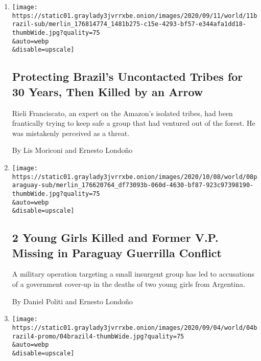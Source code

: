 \begin{enumerate}
\def\labelenumi{\arabic{enumi}.}
\item
  \href{/2020/09/11/world/americas/brazil-uncontacted-tribes.html}{}

  \texttt{[image: https://static01.graylady3jvrrxbe.onion/images/2020/09/11/world/11brazil-sub/merlin\_176814774\_1481b275-c15e-4293-bf57-e344afa1dd18-thumbWide.jpg?quality=75\\\&auto=webp\\\&disable=upscale]}

  \hypertarget{protecting-brazils-uncontacted-tribes-for-30-years-then-killed-by-an-arrow}{%
  \subsection{Protecting Brazil's Uncontacted Tribes for 30 Years, Then
  Killed by an
  Arrow}\label{protecting-brazils-uncontacted-tribes-for-30-years-then-killed-by-an-arrow}}

  Rieli Franciscato, an expert on the Amazon's isolated tribes, had been
  frantically trying to keep safe a group that had ventured out of the
  forest. He was mistakenly perceived as a threat.

  By Lis Moriconi and Ernesto Londoño
\item
  \href{/2020/09/11/world/americas/paraguay-military-girls.html}{}

  \texttt{[image: https://static01.graylady3jvrrxbe.onion/images/2020/10/08/world/08paraguay-sub/merlin\_176620764\_df73093b-060d-4630-bf87-923c97398190-thumbWide.jpg?quality=75\\\&auto=webp\\\&disable=upscale]}

  \hypertarget{2-young-girls-killed-and-former-vp-missing-in-paraguay-guerrilla-conflict}{%
  \subsection{2 Young Girls Killed and Former V.P. Missing in Paraguay
  Guerrilla
  Conflict}\label{2-young-girls-killed-and-former-vp-missing-in-paraguay-guerrilla-conflict}}

  A military operation targeting a small insurgent group has led to
  accusations of a government cover-up in the deaths of two young girls
  from Argentina.

  By Daniel Politi and Ernesto Londoño
\item
  \href{/2020/09/04/world/americas/brazil-wetlands-fires-pantanal.html}{}

  \texttt{[image: https://static01.graylady3jvrrxbe.onion/images/2020/09/04/world/04brazil4-promo/04brazil4-thumbWide.jpg?quality=75\\\&auto=webp\\\&disable=upscale]}


\end{enumerate}
